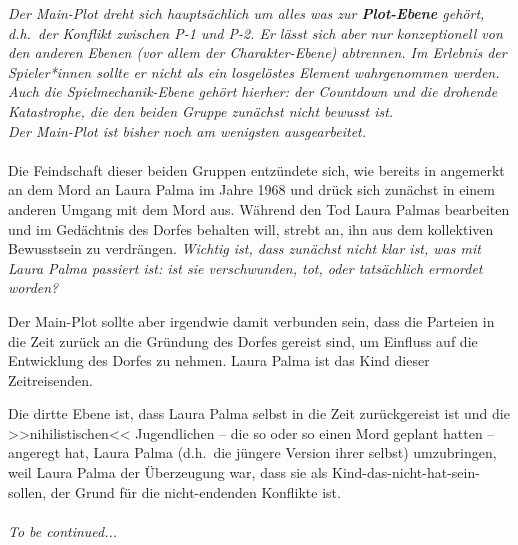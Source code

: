 \emph{Der Main-Plot dreht sich hauptsächlich um alles was zur \textbf{Plot-Ebene}
gehört, d.h.~der Konflikt zwischen P-1 und P-2. 
Er lässt sich aber nur konzeptionell von den anderen Ebenen (vor allem der
Charakter-Ebene) abtrennen. Im Erlebnis der Spieler*innen sollte er nicht als
ein losgelöstes Element wahrgenommen werden. 
Auch die Spielmechanik-Ebene gehört hierher: der Countdown und die drohende
Katastrophe, die den beiden Gruppe zunächst \emph{nicht} bewusst ist.\\
Der Main-Plot ist bisher noch am wenigsten ausgearbeitet.}\\\\
%
Die Feindschaft dieser beiden Gruppen entzündete sich, wie bereits in
 angemerkt an dem Mord an Laura Palma im Jahre 1968 und
drück sich zunächst in einem anderen Umgang mit dem Mord aus. Während
 den Tod Laura Palmas bearbeiten und im Gedächtnis des Dorfes
behalten will, strebt  an, ihn aus dem kollektiven Bewusstsein
zu verdrängen.
\emph{Wichtig ist, dass zunächst nicht klar ist, was mit Laura Palma passiert
ist: ist sie verschwunden, tot, oder tatsächlich ermordet worden?}

Der Main-Plot sollte aber irgendwie damit verbunden sein, dass die Parteien in
die Zeit zurück an die Gründung des Dorfes gereist sind, um Einfluss auf die
Entwicklung des Dorfes zu nehmen. Laura Palma ist das Kind dieser
Zeitreisenden.

Die dirtte Ebene ist, dass Laura Palma selbst in die Zeit zurückgereist ist und
die >>nihilistischen<< Jugendlichen -- die so oder so einen Mord geplant hatten
-- angeregt hat, Laura Palma (d.h.~die jüngere Version ihrer selbst)
umzubringen, weil Laura Palma der Überzeugung war, dass sie als
Kind-das-nicht-hat-sein-sollen, der Grund für die nicht-endenden Konflikte
ist.\\\\

\emph{To be continued...}
